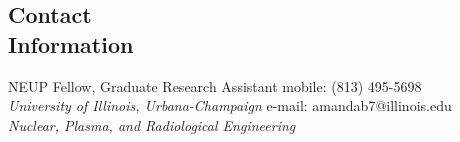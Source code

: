 \documentclass[margin,line]{resume}
\begin{document}
\begin{resume}



    \section{\mysidestyle Contact\\Information}
    NEUP Fellow, Graduate Research Assistant \hfill mobile: (813) 495-5698 \vspace{0mm}\\\vspace{0mm}%
    \textsl{University of Illinois, Urbana-Champaign} \hfill e-mail: amandab7@illinois.edu            \vspace{0mm}\\\vspace{0mm}%
        \textsl{Nuclear, Plasma, and Radiological Engineering}
    \vspace{-2mm}\\\vspace{-6mm}%


\end{resume}
\end{document}
